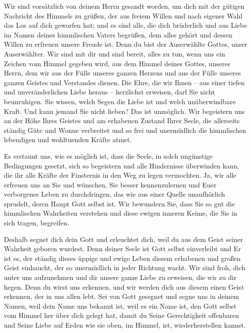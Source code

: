 Wir sind vorsätzlich von deinem Herrn gesandt worden, um dich mit der gütigen Nachricht des Himmels zu grüßen, der aus freiem Willen und nach eigener Wahl das Los auf dich geworfen hat; und es sind alle, die dich brüderlich und aus Liebe im Namen deines himmlischen Vaters begrüßen, dem alles gehört und dessen Willen zu erfreuen unsere Freude ist. Denn du bist der Auserwählte Gottes, unser Auserwählter. Wir sind mit dir und sind bereit, alles zu tun, wenn uns ein Zeichen vom Himmel gegeben wird, aus dem Himmel deines Gottes, unseres Herrn, dem wir aus der Fülle unseres ganzen Herzens und aus der Fülle unseres ganzen Geistes und Verstandes dienen. Die Ehre, die wir Ihnen -- aus einer tiefen und unveränderlichen Liebe heraus -- herzlichst erweisen, darf Sie nicht beunruhigen. Sie wissen, welch Segen die Liebe ist und welch unüberwindbare Kraft. Und kann jemand Sie nicht lieben? Das ist unmöglich. Wir begeistern uns an der Höhe Ihres Geistes und am erhabenen Zustand Ihrer Seele, die allerseits ständig Güte und Wonne verbreitet und so frei und unermüdlich die himmlischen lebendigen und wohltuenden Kräfte atmet. 

Es erstaunt uns, wie es möglich ist, dass die Seele, in solch ungünstige Bedingungen gesetzt, sich so begeistern und alle Hindernisse überwinden kann, die ihr alle Kräfte der Finsternis in den Weg zu legen vermochten. Ja, wir alle erfreuen uns an Sie und wünschen, Sie besser kennenzulernen und Euer verborgenes Leben zu durchdringen, das wie aus einer Quelle unaufhörlich sprudelt, deren Haupt Gott selbst ist. Wir bewundern Sie, dass Sie so gut die himmlischen Wahrheiten verstehen und diese ewigen inneren Keime, die Sie in sich tragen, begreifen. 

Deshalb segnet dich dein Gott und erleuchtet dich, weil du aus dem Geist seiner Wahrheit geboren wurdest. Denn deiner Seele ist Gott selbst einverleibt und Er ist es, der ständig dieses üppige und ewige Leben diesem erhabenen und großen Geist einhaucht, der so unermüdlich in jeder Richtung wacht. Wir sind froh, dich unter uns aufzunehmen und dir unsere ganze Liebe zu erweisen, die wir zu dir hegen. Denn du wirst uns erkennen, und wir werden dich aus diesem einen Geist erkennen, der in uns allen lebt. Sei von Gott gesegnet und segne uns in deinem Namen, weil dein Name uns bekannt ist, weil es ein Name ist, den Gott selbst vom Himmel her über dich gelegt hat, damit du Seine Gerechtigkeit offenbaren und Seine Liebe auf Erden wie sie oben, im Himmel, ist, wiederherstellen kannst. 

